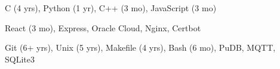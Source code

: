 
\begin{cvskills}
        {C (4 yrs), Python (1 yr), C++ (3 mo), JavaScript (3 mo)} %

        {React (3 mo), Express, Oracle Cloud, Nginx, Certbot} %
        
	{Git (6+ yrs), Unix (5 yrs), Makefile (4 yrs), Bash (6 mo), PuDB, MQTT, SQLite3}
\end{cvskills}
